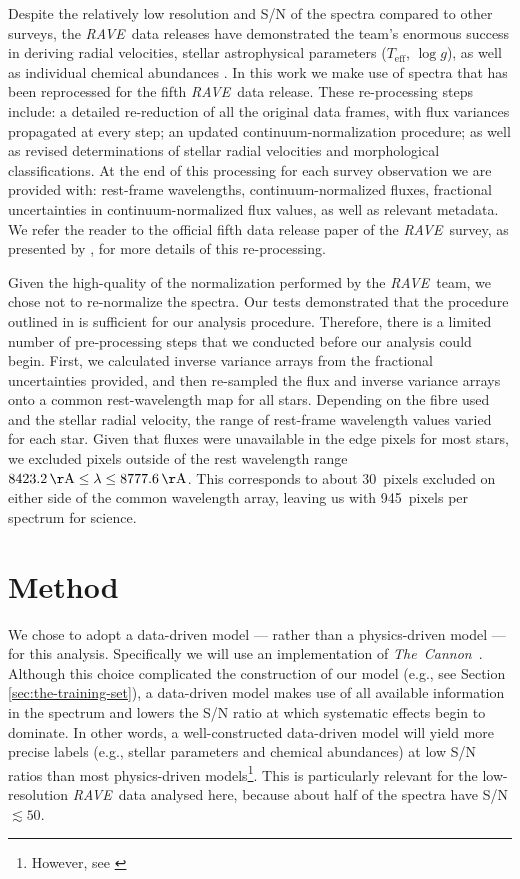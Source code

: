 \documentclass[preprint,trackchanges]{aastex}
\newcommand{\acronym}[1]{{\small{#1}}}
\newcommand{\project}[1]{\textsl{#1}}
\newcommand{\thecannon}{\project{The~Cannon}}
\newcommand{\rave}{\project{\acronym{RAVE}}}
\newcommand{\teff}{T_{\mathrm{eff}}}
\newcommand{\logg}{\log g}
\begin{document}
Despite the relatively low resolution and S/N of the spectra compared to other
surveys, the \rave\ data releases have demonstrated the team's enormous success 
in deriving radial velocities, stellar astrophysical parameters ($\teff$, $\logg$),
as well as individual chemical abundances \citep{Steinmetz_2006,Zwitter_2008,
Siebert_2011,Kordopatis_2013,Kunder_2016}.  In this work we make use of spectra
that has been reprocessed for the fifth \rave\ data release.  These re-processing
steps include: a detailed re-reduction of all the original data frames, with flux
variances propagated at every step; an updated continuum-normalization procedure;
as well as revised determinations of stellar radial velocities and morphological
classifications. At the end of this processing for each survey observation we are 
provided with: rest-frame wavelengths, continuum-normalized fluxes, fractional 
uncertainties in continuum-normalized flux values, as well as relevant metadata.  
We refer the reader to the official fifth data release paper of the \rave\ survey, 
as presented by \citet{Kunder_2016}, for more details of this re-processing.


Given the high-quality of the normalization performed by the \rave\ team, we chose
not to re-normalize the spectra.  Our tests demonstrated that the procedure 
outlined in \citet{Kunder_2016} is sufficient for our analysis procedure. Therefore,
there is a limited number of pre-processing steps that we conducted before our
analysis could begin.  First, we calculated inverse variance arrays from the
fractional uncertainties provided, and then re-sampled the flux and inverse variance
arrays onto a common rest-wavelength map for all stars.  Depending on the fibre 
used and the stellar radial velocity, the range of rest-frame wavelength values
varied for each star.  Given that fluxes were unavailable in the edge pixels for 
most stars, we excluded pixels outside of the rest wavelength range 
$8423.2\,{\rm \AA} \le \lambda \le 8777.6\,{\rm \AA}$.  This corresponds to about
30~pixels excluded on either side of the common wavelength array, leaving us with
945~pixels per spectrum for science.


\section{Method}
\label{sec:method}

We chose to adopt a data-driven model --- rather than a physics-driven model ---
for this analysis.  Specifically we will use an implementation of \thecannon\
\citep{Ness_2015,Ness_2016}.  Although this choice complicated the construction 
of our model (e.g., see Section \ref{sec:the-training-set}), a data-driven model 
makes use of all available information in the spectrum and lowers the S/N ratio 
at which systematic effects begin to dominate.  In other words, a well-constructed
data-driven model will yield more precise labels (e.g., stellar parameters and
chemical abundances) at low S/N ratios than most physics-driven models\footnote{
However, see \citet{Casey_2016a}}.  This is particularly relevant for the 
low-resolution \rave\ data analysed here, because about half of the spectra have
S/N $\lesssim 50$.  
\end{document}
